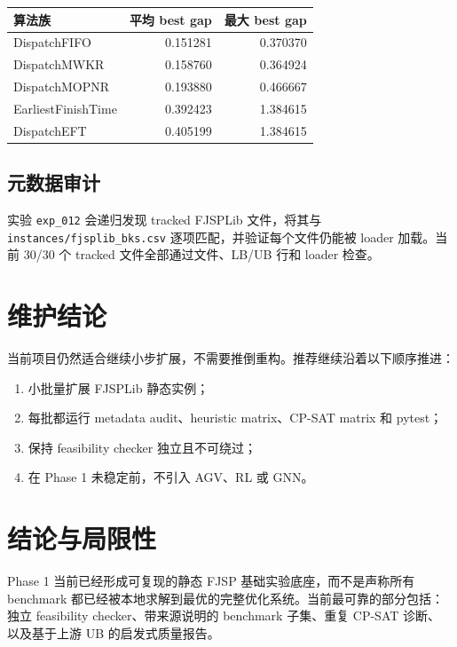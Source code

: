 ﻿\documentclass[11pt]{ctexart}
\begin{document}
\begin{table}[h]
\centering
\begin{tabular}{lrr}
\toprule
算法族 & 平均 best gap & 最大 best gap \\
\midrule
DispatchFIFO & 0.151281 & 0.370370 \\
DispatchMWKR & 0.158760 & 0.364924 \\
DispatchMOPNR & 0.193880 & 0.466667 \\
EarliestFinishTime & 0.392423 & 1.384615 \\
DispatchEFT & 0.405199 & 1.384615 \\
\bottomrule
\end{tabular}
\end{table}

\subsection{元数据审计}

实验 \texttt{exp\_012} 会递归发现 tracked FJSPLib 文件，将其与
\texttt{instances/fjsplib\_bks.csv} 逐项匹配，并验证每个文件仍能被 loader
加载。当前 30/30 个 tracked 文件全部通过文件、LB/UB 行和 loader 检查。

\section{维护结论}

当前项目仍然适合继续小步扩展，不需要推倒重构。推荐继续沿着以下顺序推进：

\begin{enumerate}
  \item 小批量扩展 FJSPLib 静态实例；
  \item 每批都运行 metadata audit、heuristic matrix、CP-SAT matrix 和 pytest；
  \item 保持 feasibility checker 独立且不可绕过；
  \item 在 Phase 1 未稳定前，不引入 AGV、RL 或 GNN。
\end{enumerate}

\section{结论与局限性}

Phase 1 当前已经形成可复现的静态 FJSP 基础实验底座，而不是声称所有
benchmark 都已经被本地求解到最优的完整优化系统。当前最可靠的部分包括：
独立 feasibility checker、带来源说明的 benchmark 子集、重复 CP-SAT 诊断、
以及基于上游 UB 的启发式质量报告。
\end{document}
